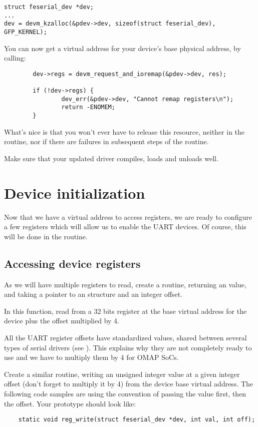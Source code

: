 \begin{verbatim}
struct feserial_dev *dev;
...
dev = devm_kzalloc(&pdev->dev, sizeof(struct feserial_dev), GFP_KERNEL);
\end{verbatim}

You can now get a virtual address for your device's base physical
address, by calling:

\begin{verbatim}
        dev->regs = devm_request_and_ioremap(&pdev->dev, res);

        if (!dev->regs) {
                dev_err(&pdev->dev, "Cannot remap registers\n");
                return -ENOMEM;
        }
\end{verbatim}

What's nice is that you won't ever have to release this resource,
neither in the  routine, nor if there are failures
in subsequent steps of the  routine.

Make sure that your updated driver compiles, loads and unloads well.

\section{Device initialization}

Now that we have a virtual address to access registers, we are ready to
configure a few registers which will allow us to enable the UART
devices. Of course, this will be done in the  routine.

\subsection{Accessing device registers}

As we will have multiple registers to read, create a 
routine, returning an  value, and  taking a 
pointer to an  structure and an  integer
offset.

In this function, read from a 32 bits register at the base virtual
address for the device plus the offset multiplied by 4.

All the UART register offsets have standardized values, shared between
several types of serial drivers (see
). This explains why they are not
completely ready to use and we have to multiply them by 4 for OMAP SoCs.

Create a similar  routine, writing an unsigned integer
value at a given integer offset (don't forget to multiply it by 4) from
the device base virtual address. The following code samples are using
the  convention of passing the value first, then the
offset. Your prototype should look like:
\begin{verbatim}
    static void reg_write(struct feserial_dev *dev, int val, int off);
\end{verbatim}

